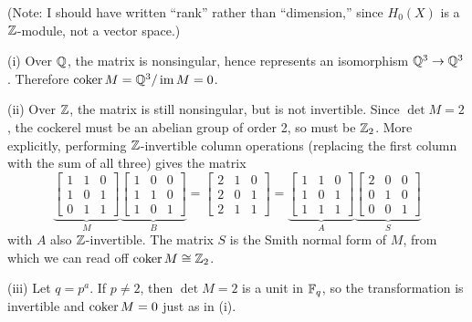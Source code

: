 (Note: I should have written ``rank'' rather than ``dimension,'' since
$H_0(X)$ is a $\mathbb{Z}$-module, not a vector space.)


\soln (i) Over $\mathbb{Q}$, the matrix is nonsingular, hence represents an isomorphism $\mathbb{Q}^3\to\mathbb{Q}^3$.  Therefore
$\operatorname{coker} M=\mathbb{Q}^3/\operatorname{im} M=0$.

(ii) Over $\mathbb{Z}$, the matrix is still nonsingular, but is not invertible.  Since $\det M=2$, the cockerel must be an abelian group of order 2, so must be $\mathbb{Z}_2$.  More explicitly, performing $\mathbb{Z}$-invertible column operations (replacing the first column with the sum of all three) gives the matrix
\[
\underbrace{\begin{bmatrix} 1&1&0\\1&0&1\\0&1&1\end{bmatrix}}_M
\underbrace{\begin{bmatrix} 1&0&0\\1&1&0\\1&0&1\end{bmatrix}}_B =
\begin{bmatrix} 2&1&0\\2&0&1\\2&1&1\end{bmatrix} =
\underbrace{\begin{bmatrix} 1&1&0\\1&0&1\\1&1&1\end{bmatrix}}_A
\underbrace{\begin{bmatrix} 2&0&0\\0&1&0\\0&0&1\end{bmatrix}}_S
\]
with $A$ also $\mathbb{Z}$-invertible.  The matrix $S$ is the Smith normal form of $M$, from which we can read off $\operatorname{coker} M\cong\mathbb{Z}_2$.

(iii) Let $q=p^a$.  If $p\neq 2$, then $\det M=2$ is a unit in $\mathbb{F}_q$, so the transformation is invertible and $\operatorname{coker} M=0$ just as in (i).

